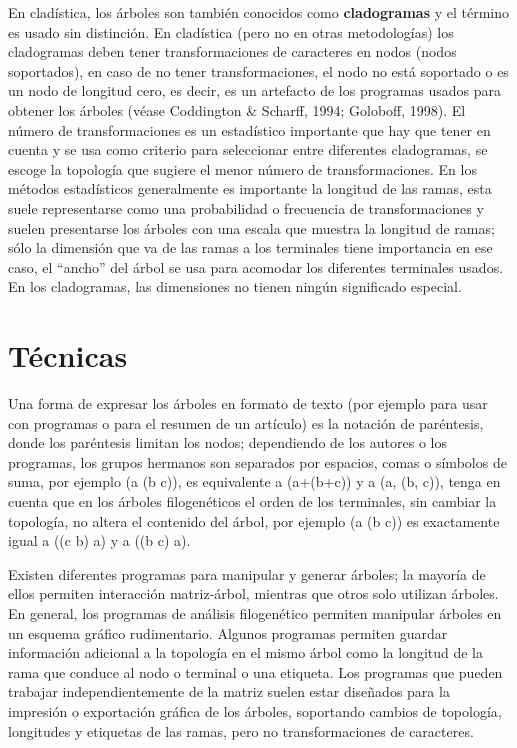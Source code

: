 En clad\'istica, los \'arboles son tambi\'en conocidos como \textbf{cladogramas} y el t\'ermino es usado sin distinci\'on. En clad\'istica (pero no en otras metodolog\'ias) los cladogramas deben tener transformaciones de caracteres en nodos (nodos soportados), en caso de no tener transformaciones, el nodo no est\'a soportado o es un nodo de longitud cero, es decir, es un artefacto de los programas usados para obtener los \'arboles (v\'ease Coddington \& Scharff, 1994; Goloboff, 1998). El n\'umero de transformaciones es un estad\'istico importante que hay que tener en cuenta y se usa como criterio para seleccionar entre diferentes cladogramas, se escoge la topolog\'ia que sugiere el  menor n\'umero de transformaciones. En los m\'etodos estad\'isticos generalmente es importante la longitud de las ramas, esta suele representarse como una probabilidad o frecuencia de transformaciones y suelen presentarse los \'arboles con una escala que muestra la longitud de ramas; s\'olo la dimensi\'on que va de las ramas a los terminales tiene importancia en ese caso, el ``ancho'' del \'arbol se usa para acomodar los diferentes terminales usados. En los cladogramas, las dimensiones no tienen ning\'un significado especial.


\section*{T\'ecnicas}

Una forma de expresar los \'arboles en formato de texto (por ejemplo para usar con programas o para el resumen de un art\'iculo) es la notaci\'on de par\'entesis, donde los par\'entesis limitan los nodos; dependiendo de los autores o los programas, los grupos hermanos son separados por espacios, comas o s\'imbolos de suma, por ejemplo (a (b c)), es equivalente a (a+(b+c)) y a (a, (b, c)), tenga en cuenta que en los \'arboles filogen\'eticos el orden de los terminales, sin cambiar la topolog\'ia, no altera el contenido del \'arbol, por ejemplo (a (b c)) es exactamente igual a ((c b) a) y a ((b c) a).

Existen diferentes programas para manipular y generar \'arboles; la mayor\'ia de ellos permiten interacci\'on matriz-\'arbol, mientras que otros solo utilizan \'arboles. En general, los programas de an\'alisis filogen\'etico permiten manipular \'arboles en un esquema gr\'afico rudimentario. Algunos programas permiten guardar informaci\'on adicional a la topolog\'ia en el mismo \'arbol como la longitud de la rama que conduce al nodo o terminal o una etiqueta. Los programas que pueden trabajar independientemente de la matriz suelen estar dise\~nados para la impresi\'on o exportaci\'on gr\'afica de los \'arboles, soportando cambios de topolog\'ia, longitudes y etiquetas de las ramas, pero no transformaciones de caracteres.

